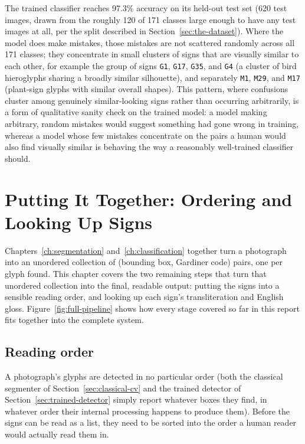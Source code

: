\documentclass[11pt,a4paper]{report}
\begin{document}
The trained classifier reaches 97.3\% accuracy on its held-out test set (620
test images, drawn from the roughly 120 of 171 classes large enough to have
any test images at all, per the split described in
Section~\ref{sec:the-dataset}). Where the model does make mistakes, those
mistakes are not scattered randomly across all 171 classes; they concentrate
in small clusters of signs that are visually similar to each other, for
example the group of signs \texttt{G1}, \texttt{G17}, \texttt{G35}, and
\texttt{G4} (a cluster of bird hieroglyphs sharing a broadly similar
silhouette), and separately \texttt{M1}, \texttt{M29}, and \texttt{M17}
(plant-sign glyphs with similar overall shapes). This pattern, where
confusions cluster among genuinely similar-looking signs rather than
occurring arbitrarily, is a form of qualitative sanity check on the trained
model: a model making arbitrary, random mistakes would suggest something
had gone wrong in training, whereas a model whose few mistakes concentrate
on the pairs a human would also find visually similar is behaving the way a
reasonably well-trained classifier should.

\chapter{Putting It Together: Ordering and Looking Up Signs}
\label{ch:assembly}

Chapters~\ref{ch:segmentation} and~\ref{ch:classification} together turn a
photograph into an unordered collection of (bounding box, Gardiner code)
pairs, one per glyph found. This chapter covers the two remaining steps
that turn that unordered collection into the final, readable output: putting
the signs into a sensible reading order, and looking up each sign's
transliteration and English gloss. Figure~\ref{fig:full-pipeline} shows how
every stage covered so far in this report fits together into the complete
system.

\section{Reading order}
\label{sec:reading-order}

A photograph's glyphs are detected in no particular order (both the
classical segmenter of Section~\ref{sec:classical-cv} and the trained
detector of Section~\ref{sec:trained-detector} simply report whatever boxes
they find, in whatever order their internal processing happens to produce
them). Before the signs can be read as a list, they need to be sorted into
the order a human reader would actually read them in.
\end{document}
